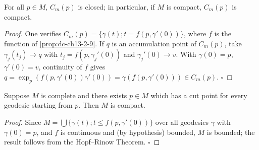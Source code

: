 \begin{corollary}
  \label{cor:dc-ch13-2-10}
  For all $p\in M$, $C_m(p)$ is closed; in particular, if $M$ is compact, $C_m(p)$ is
  compact.
\end{corollary}
\begin{proof}
  One verifies $C_m(p)=\{\gamma(t);t=f(p,\gamma'(0))\}$, where $f$ is the
  function of \cref{prop:dc-ch13-2-9}. If $q$ is an accumulation point of $C_m(p)$, take
  $\gamma_j(t_j)\to q$ with $t_j=f(p,\gamma_j'(0))$ and $\gamma_j'(0)\to v$. With
  $\gamma(0)=p$, $\gamma'(0)=v$, continuity of $f$ gives
  $q=\exp_p(f(p,\gamma'(0))\gamma'(0))=\gamma(f(p,\gamma'(0)))\in C_m(p)$. $\square$
\end{proof}

\begin{corollary}
  \label{cor:dc-ch13-2-11}
  Suppose $M$ is complete and there exists $p\in M$ which has a cut point for every
  geodesic starting from $p$. Then $M$ is compact.
\end{corollary}
\begin{proof}
  Since $M=\bigcup\{\gamma(t);t\leq f(p,\gamma'(0))\}$ over all geodesics
  $\gamma$ with $\gamma(0)=p$, and $f$ is continuous and (by hypothesis) bounded, $M$
  is bounded; the result follows from the Hopf–Rinow Theorem. $\square$
\end{proof}

